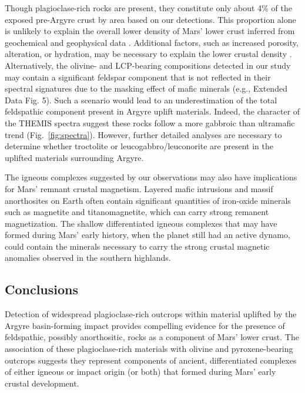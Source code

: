 \documentclass[12pt]{article}
\begin{document}
Though plagioclase-rich rocks are present, they constitute only about 4\% of the exposed pre-Argyre crust by area based on our detections. This proportion alone is unlikely to explain the overall lower density of Mars' lower crust inferred from geochemical and geophysical data \citep{Baratoux2014, Goossens2017, Knapmeyer-Endrun2021, Drilleau2023, Joshi2023}. Additional factors, such as increased porosity, alteration, or hydration, may be necessary to explain the lower crustal density \citep{Ehlmann2010, Bandfield2013, Sun2015, Wordsworth2017, Goossens2017, Wieczorek2022, Carrasco2023}. Alternatively, the olivine- and LCP-bearing compositions detected in our study may contain a significant feldspar component that is not reflected in their spectral signatures due to the masking effect of mafic minerals (e.g., Extended Data Fig. 5). Such a scenario would lead to an underestimation of the total feldspathic component present in Argyre uplift materials. Indeed, the character of the THEMIS spectra suggest these rocks follow a more gabbroic than ultramafic trend (Fig.~\ref{fig:spectra}). However, further detailed analyses are necessary to determine whether troctolite or leucogabbro/leuconorite are present in the uplifted materials surrounding Argyre.

The igneous complexes suggested by our observations may also have implications for Mars' remnant crustal magnetism. Layered mafic intrusions and massif anorthosites on Earth often contain significant quantities of iron-oxide minerals such as magnetite and titanomagnetite, which can carry strong remanent magnetization. The shallow differentiated igneous complexes that may have formed during Mars' early history, when the planet still had an active dynamo, could contain the minerals necessary to carry the strong crustal magnetic anomalies observed in the southern highlands.

\subsection*{Conclusions}

Detection of widespread plagioclase-rich outcrops within material uplifted by the Argyre basin-forming impact provides compelling evidence for the presence of feldspathic, possibly anorthositic, rocks as a component of Mars' lower crust. The association of these plagioclase-rich materials with olivine and pyroxene-bearing outcrops suggests they represent components of ancient, differentiated complexes of either igneous or impact origin (or both) that formed during Mars' early crustal development.
\end{document}
